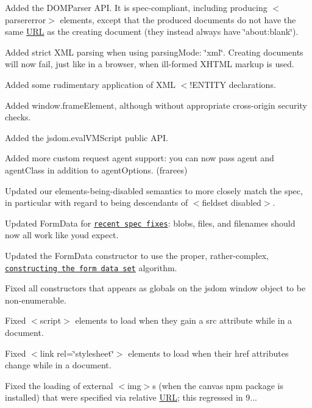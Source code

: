 \begin{DoxyItemize}
\item Added the {\ttfamily D\+O\+M\+Parser} A\+PI. It is spec-\/compliant, including producing {\ttfamily $<$parsererror$>$} elements, except that the produced documents do not have the same \mbox{\hyperlink{namespace_u_r_l}{U\+RL}} as the creating document (they instead always have {\ttfamily \char`\"{}about\+:blank\char`\"{}}).
\item Added strict X\+ML parsing when using {\ttfamily parsing\+Mode\+: \char`\"{}xml\char`\"{}}. Creating documents will now fail, just like in a browser, when ill-\/formed X\+H\+T\+ML markup is used.
\item Added some rudimentary application of X\+ML {\ttfamily $<$!\+E\+N\+T\+I\+TY} declarations.
\item Added {\ttfamily window.\+frame\+Element}, although without appropriate cross-\/origin security checks.
\item Added the {\ttfamily jsdom.\+eval\+V\+M\+Script} public A\+PI.
\item Added more custom request agent support\+: you can now pass {\ttfamily agent} and {\ttfamily agent\+Class} in addition to {\ttfamily agent\+Options}. (frarees)
\item Updated our elements-\/being-\/disabled semantics to more closely match the spec, in particular with regard to being descendants of {\ttfamily $<$fieldset disabled$>$}.
\item Updated {\ttfamily Form\+Data} for \href{https://github.com/whatwg/xhr/commit/1a75845e67792418a7721d516266ad01a90f2062}{\tt recent spec fixes}\+: blobs, files, and filenames should now all work like you\textquotesingle{}d expect.
\item Updated the {\ttfamily Form\+Data} constructor to use the proper, rather-\/complex, \href{https://html.spec.whatwg.org/multipage/forms.html#constructing-form-data-set}{\tt constructing the form data set} algorithm.
\item Fixed all constructors that appears as globals on the jsdom {\ttfamily window} object to be non-\/enumerable.
\item Fixed {\ttfamily $<$script$>$} elements to load when they gain a {\ttfamily src} attribute while in a document.
\item Fixed {\ttfamily $<$link rel=\char`\"{}stylesheet\char`\"{}$>$} elements to load when their {\ttfamily href} attributes change while in a document.
\item Fixed the loading of external {\ttfamily $<$img$>$}s (when the {\ttfamily canvas} npm package is installed) that were specified via relative \mbox{\hyperlink{namespace_u_r_l}{U\+RL}}; this regressed in 9...

\end{DoxyItemize}
